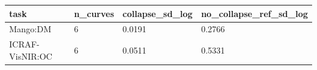\begin{tabular}{llll}
\hline
task & n\_curves & collapse\_sd\_log & no\_collapse\_ref\_sd\_log \\
\hline
Mango:DM & 6 & 0.0191 & 0.2766 \\
ICRAF-VisNIR:OC & 6 & 0.0511 & 0.5331 \\
\hline
\end{tabular}
